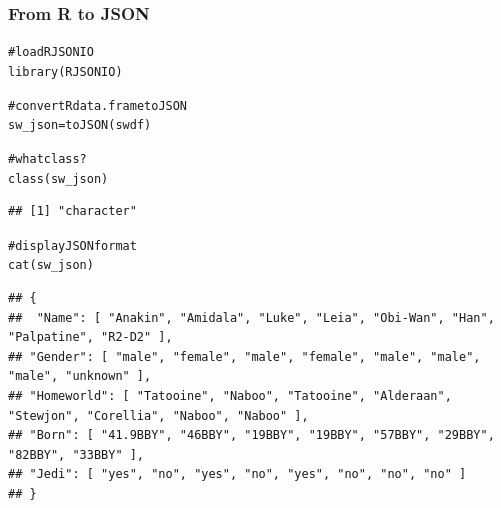 \documentclass{beamer}\usepackage[]{graphicx}\usepackage[]{color}
\makeatletter
\newcommand{\hlcom}[1]{\textcolor[rgb]{0.588,0.588,0.588}{#1}}%
\newcommand{\hlstd}[1]{\textcolor[rgb]{0.196,0.196,0.196}{#1}}%
\newcommand{\hlkwb}[1]{\textcolor[rgb]{0.627,0,0.314}{#1}}%
\newcommand{\hlkwd}[1]{\textcolor[rgb]{0.78,0.227,0.412}{#1}}%
\newenvironment{kframe}{%
 \def\at@end@of@kframe{}%
 \ifinner\ifhmode%
  \def\at@end@of@kframe{\end{minipage}}%
  \begin{minipage}{\columnwidth}%
 \fi\fi%
 \def\FrameCommand##1{\hskip\@totalleftmargin \hskip-\fboxsep
 \colorbox{shadecolor}{##1}\hskip-\fboxsep
     \hskip-\linewidth \hskip-\@totalleftmargin \hskip\columnwidth}%
 \MakeFramed {\advance\hsize-\width
   \@totalleftmargin\z@ \linewidth\hsize
   \@setminipage}}%
 {\par\unskip\endMakeFramed%
 \at@end@of@kframe}
\newenvironment{knitrout}{}{} %
\makeatother
\begin{document}

\begin{frame}[fragile]
\frametitle{From R to JSON}

\begin{knitrout}\tiny
{}\color{fgcolor}\begin{kframe}
\begin{alltt}
\hlcom{# load RJSONIO}
\hlkwd{library}\hlstd{(RJSONIO)}

\hlcom{# convert R data.frame to JSON}
\hlstd{sw_json} \hlkwb{=} \hlkwd{toJSON}\hlstd{(swdf)}

\hlcom{# what class?}
\hlkwd{class}\hlstd{(sw_json)}
\end{alltt}
\begin{verbatim}
## [1] "character"
\end{verbatim}
\begin{alltt}
\hlcom{# display JSON format}
\hlkwd{cat}\hlstd{(sw_json)}
\end{alltt}
\begin{verbatim}
## {
##  "Name": [ "Anakin", "Amidala", "Luke", "Leia", "Obi-Wan", "Han", "Palpatine", "R2-D2" ],
## "Gender": [ "male", "female", "male", "female", "male", "male", "male", "unknown" ],
## "Homeworld": [ "Tatooine", "Naboo", "Tatooine", "Alderaan", "Stewjon", "Corellia", "Naboo", "Naboo" ],
## "Born": [ "41.9BBY", "46BBY", "19BBY", "19BBY", "57BBY", "29BBY", "82BBY", "33BBY" ],
## "Jedi": [ "yes", "no", "yes", "no", "yes", "no", "no", "no" ] 
## }
\end{verbatim}
\end{kframe}
\end{knitrout}

\end{frame}

\end{document}
